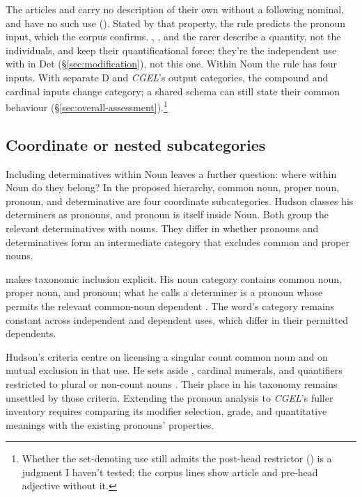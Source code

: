 \documentclass[12pt]{article}
\begin{document}
The articles and  carry no description of their own without a following nominal, and have no such use (). Stated by that property, the rule predicts the pronoun input, which the corpus confirms. , , and the rarer  describe a quantity, not the individuals, and keep their quantificational force: they're the independent use with  in Det (§\ref{sec:modification}), not this one. Within Noun the rule has four inputs. With separate D and \textit{CGEL}'s output categories, the compound and cardinal inputs change category; a shared schema can still state their common behaviour (§\ref{sec:overall-assessment}).\footnote{Whether the set-denoting use still admits the post-head restrictor () is a judgment I haven't tested; the corpus lines show article and pre-head adjective without it.}

\subsection{Coordinate or nested subcategories}\label{sec:inheritance}

Including determinatives within Noun leaves a further question: where within Noun do they belong? In the proposed hierarchy, common noun, proper noun, pronoun, and determinative are four coordinate subcategories. Hudson classes his determiners as pronouns, and pronoun is itself inside Noun. Both group the relevant determinatives with nouns. They differ in whether pronouns and determinatives form an intermediate category that excludes common and proper nouns.

\textcite[253--254]{hudson2010wordgrammar} makes taxonomic inclusion explicit. His noun category contains common noun, proper noun, and pronoun; what he calls a determiner is a pronoun whose  permits the relevant common-noun dependent \citep[9--10]{hudson2004determiners}. The word's category remains constant across independent and dependent uses, which differ in their permitted dependents.

Hudson's criteria centre on licensing a singular count common noun and on mutual exclusion in that use. He sets aside , cardinal numerals, and quantifiers restricted to plural or non-count nouns \citep[9--10]{hudson2004determiners}. Their place in his taxonomy remains unsettled by those criteria. Extending the pronoun analysis to \textit{CGEL}'s fuller inventory requires comparing its modifier selection, grade, and quantitative meanings with the existing pronouns' properties.
\end{document}
